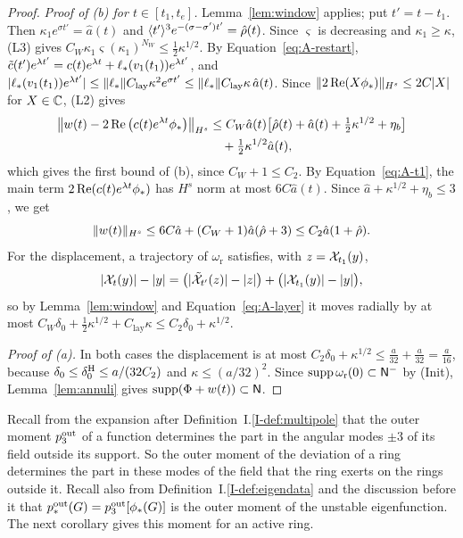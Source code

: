 \begin{proof}
\emph{Proof of (b) for $t\in[t_1,t_e]$.} Lemma~\ref{lem:window} applies; put
$t'=t-t_1$. Then $\kappa_1e^{\sigma t'}=\hat a(t)$ and
$\langle t'\rangle^3e^{-(\sigma-\sigma')t'}=\hat\rho(t)$. Since $\varsigma$ is decreasing and
$\kappa_1\ge\kappa$, (L3) gives $C_W\kappa_1\varsigma(\kappa_1)^{N_W}\le\frac12\kappa^{1/2}$.
By Equation~\eqref{eq:A-restart},
$\tilde c(t')e^{\lambda t'}=c(t)e^{\lambda t}+\ell_*(v_1(t_1))e^{\lambda t'}$, and
$|\ell_*(v_1(t_1))e^{\lambda t'}|\le\|\ell_*\|C_{\mathrm{lay}}\kappa^2e^{\sigma t'}\le\|\ell_*\|C_{\mathrm{lay}}\kappa\,\hat a(t)$.
Since $\|2\Re(X\phi_*)\|_{H^s}\le2C|X|$ for $X\in\mathbb{C}$, (L2) gives
\[
\begin{aligned}
\big\|w(t)-2\Re\big(c(t)e^{\lambda t}\phi_*\big)\big\|_{H^s}
&\le C_W\hat a(t)\big[\hat\rho(t)+\hat a(t)+\tfrac12\kappa^{1/2}+\eta_b\big]\\
&\quad+\tfrac12\kappa^{1/2}\hat a(t),
\end{aligned}
\]
which gives the first bound of (b), since $C_W+1\le C_2$. By
Equation~\eqref{eq:A-t1}, the main term $2\Re(c(t)e^{\lambda t}\phi_*)$ has $H^s$ norm
at most $6C\hat a(t)$. Since $\hat a+\kappa^{1/2}+\eta_b\le3$, we get
\[
\|w(t)\|_{H^s}\le6C\hat a+(C_W+1)\hat a(\hat\rho+3)\le C_2\hat a(1+\hat\rho).
\]
For the displacement, a trajectory of $\omega_{\mathrm r}$ satisfies, with $z=\mathcal{X}_{t_1}(y)$,
\[
|\mathcal{X}_t(y)|-|y|=\big(|\tilde{\mathcal{X}}_{t'}(z)|-|z|\big)+\big(|\mathcal{X}_{t_1}(y)|-|y|\big),
\]
so by Lemma~\ref{lem:window} and Equation~\eqref{eq:A-layer} it moves radially by at
most $C_W\delta_0+\frac12\kappa^{1/2}+C_{\mathrm{lay}}\kappa\le C_2\delta_0+\kappa^{1/2}$.

\emph{Proof of (a).} In both cases the displacement is at most
$C_2\delta_0+\kappa^{1/2}\le\frac a{32}+\frac a{32}=\frac a{16}$, because
$\delta_0\le\delta_0^{\mathrm{H}}\le a/(32C_2)$ and $\kappa\le(a/32)^2$. Since
$\operatorname{supp}\omega_{\mathrm r}(0)\subset\mathsf{N}^{-}$ by (Init), Lemma~\ref{lem:annuli} gives
$\operatorname{supp}(\Phi+w(t))\subset\nobreak\mathsf{N}$.
\end{proof}

Recall from the expansion after Definition~I.\ref{I-def:multipole} that the outer
moment $p^{\mathrm{out}}_3$ of a function determines the part in the angular modes $\pm3$ of its
field outside its support. So the outer moment of the deviation of a ring
determines the part in these modes of the field that the ring exerts on the rings
outside it. Recall also from Definition~I.\ref{I-def:eigendata} and the discussion
before it that $p^{\mathrm{out}}_*(G)=p^{\mathrm{out}}_3[\phi_*(G)]$ is the outer moment of the unstable
eigenfunction.
The next corollary gives this moment for an active ring.

